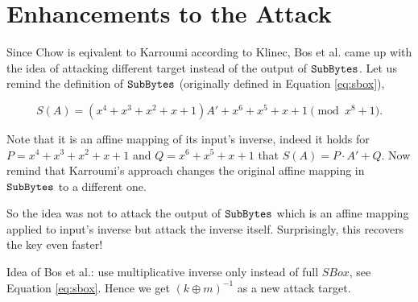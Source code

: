 \section{Enhancements to the Attack}   %

Since Chow is eqivalent to Karroumi according to Klinec, Bos et al. came up with the idea of attacking different target instead of the output of $\texttt{SubBytes}$. Let us remind the definition of $\texttt{SubBytes}$ (originally defined in Equation \ref{eq:sbox}),

\begin{equation}
\label{eq:sbox2}
	S(A) = (x^4 + x^3 + x^2 + x + 1)A' + x^6 + x^5 + x + 1 \pmod{x^8+1} .
\end{equation}

Note that it is an affine mapping of its input's inverse, indeed it holds for $P = x^4 + x^3 + x^2 + x + 1$ and $Q = x^6 + x^5 + x + 1$ that $S(A) = P\cdot A' + Q$. Now remind that Karroumi's approach changes the original affine mapping in $\texttt{SubBytes}$ to a different one.

So the idea was not to attack the output of $\texttt{SubBytes}$ which is an affine mapping applied to input's inverse but attack the inverse itself. Surprisingly, this recovers the key even faster!


Idea of Bos et al.: use multiplicative inverse only instead of full $SBox$, see Equation \ref{eq:sbox}. Hence we get $(k\oplus m)^{-1}$ as a new attack target.



